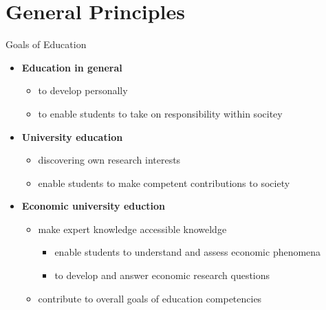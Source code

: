 \section*{General Principles}
\begin{frame}{Goals of Education}
	\pause
	\centering
	\vspace{-4mm}
	\begin{itemize}[<+->]
\item[] \hspace{-10mm} \centering \textbf{Education in general}
\begin{itemize}
	\item  to develop personally 
	\item to enable students to take on responsibility within socitey %
\end{itemize}
\item[] \hspace{-9.4mm} \centering \textbf{University education}
\begin{itemize}
	\item discovering own research interests 
	\item enable students to make competent contributions to society
\end{itemize}
\item[] \hspace{-10mm} \centering \textbf{Economic university eduction}
\begin{itemize}
	\item make expert knowledge accessible \ar knoweldge 
	\begin{itemize}
		\item enable students to understand and assess economic phenomena %
		\item to develop and answer economic research questions
	\end{itemize}
	\item contribute to overall goals of education \ar competencies
\end{itemize}
	\end{itemize}
\end{frame}


